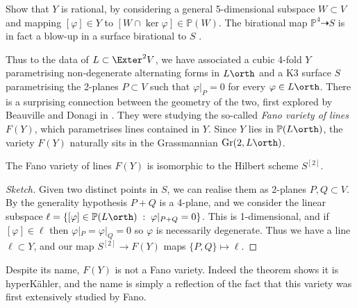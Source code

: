 \begin{exercise}
    Show that \(Y\) is rational, by considering a general 5-dimensional subspace
    \(W\subset V\) and mapping \([\varphi]\in Y\) to \([W\cap \ker\varphi]\in
    \mathbb{P}(W)\). The birational map \(\mathbb{P}^4\dashrightarrow S\) is in
    fact a blow-up in a surface birational to \(S\) \cite[see][\S
    4.1.3]{hassettSpecialCubicFourfolds}.
\end{exercise}

Thus to the data of \(L\subset \Exter^2V\), we have associated a cubic 4-fold
\(Y\) parametrising non-degenerate alternating forms in \(L\orth\) and a K3
surface \(S\) parametrising the 2-planes \(P\subset V\)  such that
\(\varphi|_P=0\) for every \(\varphi\in L\orth\). There is a surprising
connection between the geometry of the two, first explored by Beauville and
Donagi in \cite{beauvilleVarieteDroitesHypersurface}. They were studying the
so-called \textit{Fano variety of lines} \(F(Y)\), which parametrises
lines contained in \(Y\). Since \(Y\) lies in \(\mathbb{P}(L\orth)\), the
variety \(F(Y)\) naturally sits in the Grassmannian
\(\text{Gr}(2,L\orth)\).

\begin{theorem}
    The Fano variety of lines \(F(Y)\) is isomorphic to the Hilbert scheme
    \(S^{[2]}\).

    \begin{proof}[Sketch]
        Given two distinct points in \(S\), we can realise them as \(2\)-planes
        \(P,Q\subset V\). By the generality hypothesis \(P+Q\)
        is a 4-plane, and we consider the linear subspace \(\ell=\{[\varphi]\in
        \mathbb{P}(L\orth)\;:\; \varphi|_{P+Q}=0\}\). This is 1-dimensional, and
        if \([\varphi]\in \ell\) then \(\varphi|_P=\varphi|_Q=0\) so
        \(\varphi\) is necessarily degenerate. Thus we have a line \(\ell\subset
        Y\), and our map \(S^{[2]}\to F(Y)\) maps \(\{P,Q\}\mapsto \ell\).
    \end{proof}
\end{theorem}

\begin{remark}
    Despite its name, \(F(Y)\) is not a Fano variety. Indeed the theorem shows
    it is hyperK\"ahler, and the name is simply a reflection of the fact that
    this variety was first extensively studied by Fano.
\end{remark}

